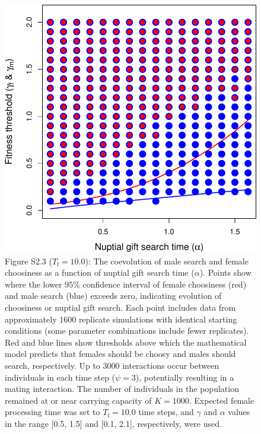 \documentclass[
]{article}
\begin{document}
\captionsetup{labelformat=default}

\clearpage

\captionsetup{labelformat=empty}

\begin{figure}
\centering
\includegraphics{ms_biorxiv_files/figure-latex/unnamed-chunk-8-1.pdf}
\caption{Figure S2.3 (\(T_{\mathrm{f}} = 10.0\)): The coevolution of
male search and female choosiness as a function of nuptial gift search
time (\(\alpha\)). Points show where the lower 95\% confidence interval
of female choosiness (red) and male search (blue) exceeds zero,
indicating evolution of choosiness or nuptial gift search. Each point
includes data from approximately 1600 replicate simulations with
identical starting conditions (some parameter combinations include fewer
replicates). Red and blue lines show thresholds above which the
mathematical model predicts that females should be choosy and males
should search, respectively. Up to 3000 interactions occur between
individuals in each time step (\(\psi = 3\)), potentially resulting in a
mating interaction. The number of individuals in the population remained
at or near carrying capacity of \(K = 1000\). Expected female processing
time was set to \(T_{\mathrm{f}}=10.0\) time steps, and \(\gamma\) and
\(\alpha\) values in the range {[}0.5, 1.5{]} and {[}0.1, 2.1{]},
respectively, were used.}
\end{figure}
\end{document}

